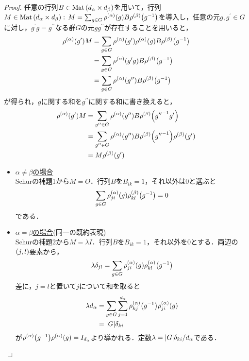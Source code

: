 \documentclass[main]{subfiles}
\begin{document}
	\begin{proof}
		任意の行列$B\in\operatorname{Mat}\qty(d_\alpha\times d_\beta)$を用いて，行列$M\in\operatorname{Mat}\qty(d_\alpha\times d_\beta):\,M=\sum_{g\in G}\rho^\qty(\alpha)\qty(g)B\rho^\qty(\beta)\qty(g^{-1})$を導入し，任意の元$g,g^\prime\in G$に対し，$g^\prime g=g^{\prime\prime}$なる群$G$の元$gg^{\prime\prime}$が存在することを用いると，
		\begin{align*}
			\rho^\qty(\alpha)\qty(g^\prime)M & =\sum_{g\in G}\rho^\qty(\alpha)\qty(g^\prime)\rho^\qty(\alpha)\qty(g)B\rho^\qty(\beta)\qty(g^{-1}) \\
			                                 & =\sum_{g\in G}\rho^\qty(\alpha)\qty(g^\prime g)B\rho^\qty(\beta)\qty(g^{-1})                       \\
			                                 & =\sum_{g\in G}\rho^\qty(\alpha)\qty(g^{\prime\prime})B\rho^\qty(\beta)\qty(g^{-1})
		\end{align*}
		が得られ，$g$に関する和を$g^{\prime\prime}$に関する和に書き換えると，
		\begin{align*}
			\rho^\qty(\alpha)\qty(g^\prime)M & =\sum_{g^{\prime\prime}\in G}\rho^\qty(\alpha)\qty(g^{\prime\prime})B\rho^\qty(\beta)\qty({g^{\prime\prime}}^{-1}g^\prime)                       \\
			                                 & =\sum_{g^{\prime\prime}\in G}\rho^\qty(\alpha)\qty(g^{\prime\prime})B\rho^\qty(\beta)\qty({g^{\prime\prime}}^{-1})\rho^\qty(\beta)\qty(g^\prime) \\
			                                 & =M\rho^\qty(\beta)\qty(g^\prime)
		\end{align*}
		\begin{itemize}
			\item \underline{$\alpha\neq\beta$の場合}\\
				Schurの補題1から$M=O$．行列$B$を$B_{ik}=1$，それ以外は0と選ぶと\[\sum_{g\in G}\rho_{ji}^\qty(\alpha)\qty(g)\rho_{kl}^\qty(\beta)\qty(g^{-1})=0\]である．
			\item \underline{$\alpha=\beta$の場合}(同一の既約表現)\\
				Schurの補題2から$M=\lambda I$．行列$B$を$B_{ik}=1$，それ以外を0とする．両辺の$\qty(j,l)$要素から，\[\lambda\delta_{jl}=\sum_{g\in G}\rho_{ji}^\qty(\alpha)\qty(g)\rho^\qty(\alpha)_{kl}\qty(g^{-1})\]差に，$j=l$と置いて$j$について和を取ると\begin{align*}
					\lambda d_\alpha & =\sum_{g\in G}\sum_{j=1}^{d_\alpha}\rho_{kj}^\qty(\alpha)\qty(g^{-1})\rho_{ji}^\qty(\alpha)\qty(g) \\
					                 & =\qty|G|\delta_{ki}
				\end{align*}が$\rho^\qty(\alpha)\qty(g^{-1})\rho^\qty(\alpha)\qty(g)=I_{d_\alpha}$より導かれる．定数$\lambda=\qty|G|\delta_{ki}/d_\alpha$である．
		\end{itemize}
	\end{proof}
\end{document}
